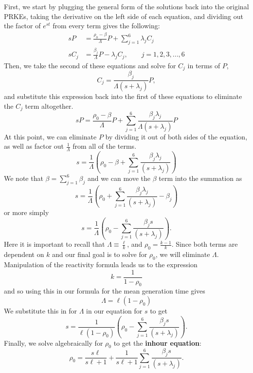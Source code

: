 \documentclass{report}
\begin{document}
First, we start by plugging the general form of the solutions back into the original PRKEs, taking the derivative on the left side of each equation, and dividing out the factor of $e^{st}$ from every term gives the following:
\begin{align*}
sP	&= \frac{\rho_0 - \beta}{\Lambda} P + \sum_{j=1}^6 \lambda_j C_j \\
sC_j	&= \frac{\beta_j}{\Lambda} P - \lambda_j C_j , \qquad j= 1,2,3,...,6
\end{align*}
Then, we take the second of these equations and solve for $C_j$ in terms of $P$,
$$ C_j = \frac{\beta_j}{\Lambda(s+\lambda_j)}P ,$$
and substitute this expression back into the first of these equations to eliminate the $C_j$ term altogether.
$$ sP = \frac{\rho_0 - \beta}{\Lambda} P + \sum_{j=1}^6 \frac{\beta_j \lambda_j}{\Lambda(s+\lambda_j)}P $$ 
At this point, we can eliminate $P$ by dividing it out of both sides of the equation, as well as factor out $\frac{1}{\Lambda}$ from all of the terms.
$$ s = \frac{1}{\Lambda}\left(\rho_0 - \beta + \sum_{j=1}^6 \frac{\beta_j \lambda_j}{(s+\lambda_j)}\right) $$ 
We note that $\beta = \sum_{j=1}^6 \beta_j$ and we can move the $\beta$ term into the summation as
$$ s = \frac{1}{\Lambda}\left(\rho_0 + \sum_{j=1}^6 \frac{\beta_j \lambda_j}{(s+\lambda_j)}-\beta_j\right) $$ 
or more simply
$$ s = \frac{1}{\Lambda}\left(\rho_0 - \sum_{j=1}^6 \frac{\beta_j s}{(s+\lambda_j)}\right) .$$ 
Here it is important to recall that $\Lambda \equiv \frac{\ell}{k}$, and $\rho_0 = \frac{k-1}{k}$. Since both terms are dependent on $k$ and our final goal is to solve for $\rho_0$, we will eliminate $\Lambda$. Manipulation of the reactivity formula leads us to the expression
$$ k = \frac{1}{1-\rho_0} $$
and so using this in our formula for the mean generation time gives
$$ \Lambda = \ell(1-\rho_0) $$
We substitute this in for $\Lambda$ in our equation for $s$ to get
$$ s = \frac{1}{\ell(1-\rho_0)}\left(\rho_0 - \sum_{j=1}^6 \frac{\beta_j s}{(s+\lambda_j)}\right) .$$
Finally, we solve algebraically for $\rho_0$ to get the \textbf{inhour equation}:
$$ \rho_0 = \frac{s\ell}{s\ell + 1} + \frac{1}{s\ell + 1}\sum_{j=1}^6 \frac{\beta_j s}{(s+\lambda_j)} .$$ 
\end{document}
